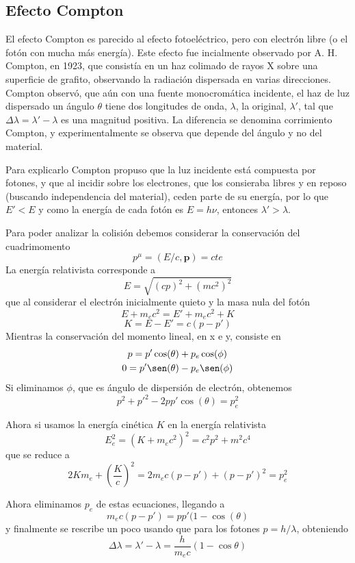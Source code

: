 \subsection{Efecto Compton}
El efecto Compton es parecido al efecto fotoeléctrico, pero con electrón libre (o el fotón con mucha más energía).
Este efecto fue incialmente observado por A. H. Compton, en 1923, que consistía en un haz colimado de rayos X sobre una superficie de grafito, observando la radiación dispersada en varias direcciones.
Compton observó, que aún con una fuente monocromática incidente, el haz de luz dispersado un ángulo $\theta$ tiene dos longitudes de onda, $\lambda$, la original, $\lambda'$, tal que  $\Delta \lambda = \lambda' - \lambda$ es una magnitud positiva.
La diferencia se denomina corrimiento Compton, y experimentalmente se observa que depende del ángulo y no del material.

Para explicarlo Compton propuso que la luz incidente está compuesta por fotones, y que al incidir sobre los electrones, que los consieraba libres y en reposo (buscando independencia del material), ceden parte de su energía, por lo que $E' < E$ y como la energía de cada fotón es $E = h \nu$, entonces $\lambda' > \lambda$.

Para poder analizar la colisión debemos considerar la conservación del cuadrimomento
\[ p^\mu = (E/c, \textbf{p}) = cte\]
La energía relativista corresponde a
\[ E = \sqrt{(cp)^2 + (m c^2)^2} \]
que al considerar el electrón inicialmente quieto y la masa nula del fotón
\[E + m_e c^2 = E' + m_e c^2 + K \]
\[K = E - E' = c (p - p') \]
Mientras la conservación del momento lineal, en x e y, consiste en
\begin{gather*}
    p = p' \cos(\theta) + p_e \cos(\phi)\\
    0 = p' \sen(\theta) - p_e \sen(\phi)
\end{gather*}
Si eliminamos $\phi$, que es ángulo de dispersión de electrón, obtenemos
\[p^2 + p'^2 - 2 p p' \cos(\theta) = p^2_e \]

Ahora si usamos la energía cinética $K$ en la energía relativista
\[ E_e^2 = (K + m_e c^2)^2 = c^2 p^2 + m^2 c^4\]
que se reduce a
\[ 2 K m_e + \left(\frac{K}{c}\right)^2 = 2 m_e c (p - p') + (p - p')^2 = p_e^2\]

Ahora eliminamos $p_e$ de estas ecuaciones, llegando a
\[m_e c (p - p') = p p' (1 - \cos(\theta)\]
y finalmente se rescribe un poco usando que para los fotones $p = h/\lambda$, obteniendo
\begin{equation}
    \Delta \lambda = \lambda' - \lambda = \frac{h}{m_e c} \left(1-\cos \theta \right)
\end{equation}

